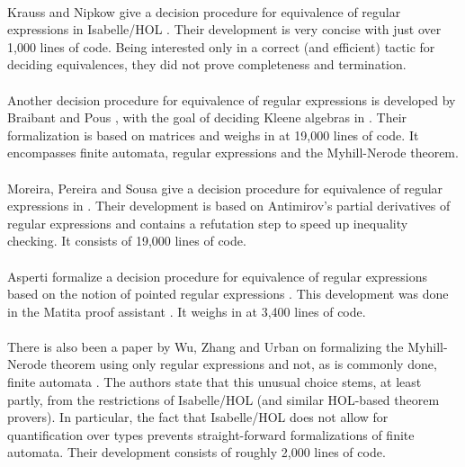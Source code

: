 \paragraph{}
Krauss and Nipkow give a decision procedure for equivalence of regular expressions in Isabelle/HOL \cite{DBLP:journals/jar/KraussN12}. Their development is very concise with just over 1,000 lines of code. Being interested only in a correct (and efficient) tactic for deciding equivalences, they did not prove completeness and termination.

\paragraph{}
Another decision procedure for equivalence of regular expressions is developed by Braibant and Pous \cite{DBLP:journals/corr/abs-1105-4537}, with the goal of deciding Kleene algebras in \coq. Their formalization is based on matrices and weighs in at 19,000 lines of code. It encompasses finite automata, regular expressions and the Myhill-Nerode theorem.

\paragraph{}
Moreira, Pereira and Sousa give a decision procedure for equivalence of regular expressions in \coq \cite{DBLP:conf/RelMiCS/MoreiraPS12}.
Their development is based on Antimirov's partial derivatives of regular expressions \cite{DBLP:journals/tcs/Antimirov96} and contains a refutation step to speed up inequality checking. It consists of 19,000 lines of code.

\paragraph{}
Asperti formalize a decision procedure for equivalence of regular expressions \cite{DBLP:conf/itp/Asperti12} based on the notion of pointed regular expressions \cite{DBLP:journals/corr/abs-1010-2604}. This development was done in the Matita proof assistant \cite{DBLP:conf/cade/AspertiRCT11}. It weighs in at 3,400 lines of code.

\paragraph{}
There is also been a paper by Wu, Zhang and Urban on formalizing the Myhill-Nerode theorem using only regular expressions and not, as is commonly done, finite automata \cite{DBLP:conf/itp/WuZU11}.
The authors state that this unusual choice stems, at least partly, from the restrictions of Isabelle/HOL (and similar HOL-based theorem provers). 
In particular, the fact that Isabelle/HOL does not allow for quantification over types prevents straight-forward formalizations of finite automata.
Their development consists of roughly 2,000 lines of code.


